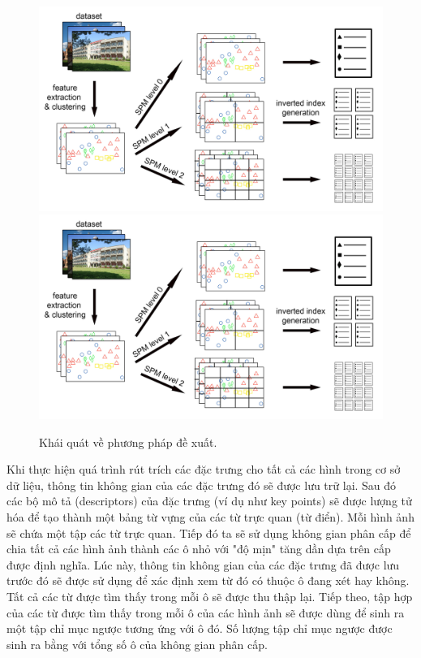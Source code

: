 \begin{figure}[!htbp]
  \begin{center}
    \leavevmode
    \ifpdf
      \includegraphics[scale=0.15]{basicIdea}
    \else
      \includegraphics[scale=0.15]{basicIdea}
    \fi
    \caption[Khái quát về phương pháp đề xuất]{Khái quát về phương pháp đề xuất.}
    \label{FigBasicIdea}
  \end{center}
\end{figure}

Khi thực hiện quá trình rút trích các đặc trưng cho tất cả các hình trong cơ sở dữ liệu, thông tin không gian của các đặc trưng đó sẽ được lưu trữ lại. Sau đó các bộ mô tả (descriptors) của đặc trưng (ví dụ như key points) sẽ được lượng tử hóa để tạo thành một bảng từ vựng của các từ trực quan (từ điển). Mỗi hình ảnh sẽ chứa một tập các từ trực quan. Tiếp đó ta sẽ sử dụng không gian phân cấp để chia tất cả các hình ảnh thành các ô nhỏ với "độ mịn" tăng dần dựa trên cấp được định nghĩa. Lúc này, thông tin không gian của các đặc trưng đã được lưu trước đó sẽ được sử dụng để xác định xem từ đó có thuộc ô đang xét hay không. Tất cả các từ được tìm thấy trong mỗi ô sẽ được thu thập lại. Tiếp theo, tập hợp của các từ được tìm thấy trong mỗi ô của các hình ảnh sẽ được dùng để sinh ra một tập chỉ mục ngược tương ứng với ô đó. Số lượng tập chỉ mục ngược được sinh ra bằng với tổng số ô của không gian phân cấp.

